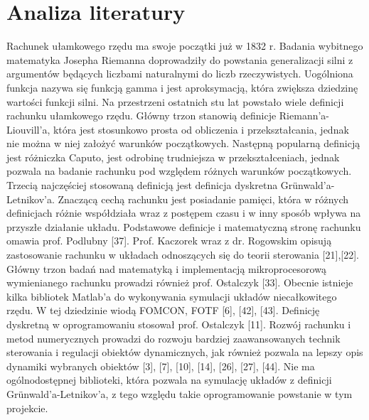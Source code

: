 \documentclass[polish,11pt,a4paper]{article}
\begin{document}
\section*{Analiza literatury}
Rachunek ułamkowego rzędu ma swoje początki już w 1832 r. Badania wybitnego matematyka Josepha Riemanna doprowadziły do powstania generalizacji silni z argumentów będących liczbami naturalnymi do liczb rzeczywistych. Uogólniona funkcja nazywa się funkcją gamma i jest aproksymacją, która zwiększa dziedzinę wartości funkcji silni. Na przestrzeni ostatnich stu lat powstało wiele definicji rachunku ułamkowego rzędu. Główny trzon stanowią definicje Riemann'a-Liouvill'a, która jest stosunkowo prosta od obliczenia i przekształcania, jednak nie można w niej założyć warunków początkowych. Następną popularną definicją jest różniczka Caputo, jest odrobinę trudniejsza w przekształceniach, jednak pozwala na badanie rachunku pod względem różnych warunków początkowych. Trzecią najczęściej stosowaną definicją jest definicja dyskretna Grünwald'a-Letnikov'a. Znaczącą cechą rachunku jest posiadanie pamięci, która w różnych definicjach różnie współdziała wraz z postępem czasu i w inny sposób wpływa na przyszłe działanie układu. Podstawowe definicje i matematyczną stronę rachunku omawia prof. Podlubny [37]. Prof. Kaczorek wraz z dr. Rogowskim opisują zastosowanie rachunku w układach odnoszących się do teorii sterowania [21],[22]. Główny trzon badań nad matematyką i implementacją mikroprocesorową wymienianego rachunku prowadzi również prof. Ostalczyk [33]. Obecnie istnieje kilka bibliotek Matlab'a do wykonywania symulacji układów niecałkowitego rzędu. W tej dziedzinie wiodą FOMCON, FOTF [6], [42], [43]. Definicję dyskretną w oprogramowaniu stosował prof. Ostalczyk [11]. Rozwój rachunku i metod numerycznych prowadzi do rozwoju bardziej zaawansowanych technik sterowania i regulacji obiektów dynamicznych, jak również pozwala na lepszy opis dynamiki wybranych obiektów [3], [7], [10], [14], [26], [27], [44]. Nie ma ogólnodostępnej biblioteki, która pozwala na symulację układów z definicji  Grünwald'a-Letnikov'a, z tego względu takie oprogramowanie powstanie w tym projekcie.
\nocite{*}  %



	
\end{document}
